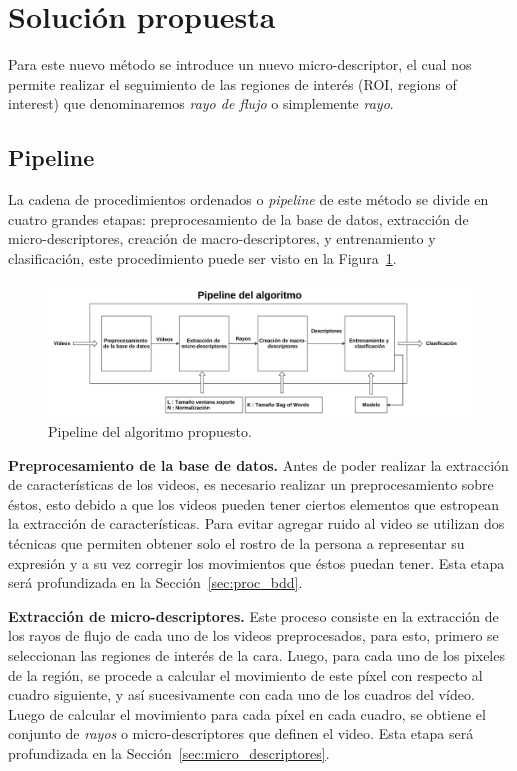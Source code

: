 \section{Solución propuesta}
\label{sec:solucion}

Para este nuevo método se introduce un nuevo micro-descriptor, el cual nos permite realizar el seguimiento de las regiones de interés (ROI, regions of interest) que denominaremos \textit{rayo de flujo} o simplemente \textit{rayo}.


\subsection{Pipeline}

La cadena de procedimientos ordenados o \textit{pipeline} de este método se divide en cuatro grandes etapas: preprocesamiento de la base de datos, extracción de micro-descriptores, creación de macro-descriptores, y entrenamiento y clasificación, este procedimiento puede ser visto en la Figura~\ref{intro:fig:pipeline}.
	\begin{figure}[b]
		\centering
		\includegraphics[width=1\textwidth]{Figuras/Diagramas/pipeline.png}
		\caption{Pipeline del algoritmo propuesto.}
		\label{intro:fig:pipeline}
	\end{figure}		
	
\textbf{Preprocesamiento de la base de datos.}
Antes de poder realizar la extracción de características de los videos, es necesario realizar un preprocesamiento sobre éstos, esto debido a que los videos pueden tener ciertos elementos que estropean la extracción de características. Para evitar agregar ruido al video se utilizan dos técnicas que permiten obtener solo el rostro de la persona a representar su expresión y a su vez corregir los movimientos que éstos puedan tener. Esta etapa será profundizada en la Sección~\ref{sec:proc_bdd}.


\textbf{Extracción de micro-descriptores.}
Este proceso consiste en la extracción de los rayos de flujo de cada uno de los videos preprocesados, para esto, primero se seleccionan las regiones de interés de la cara. Luego, para cada uno de los pixeles de la región, se procede a calcular el movimiento de este píxel con respecto al cuadro siguiente, y así sucesivamente con cada uno de los cuadros del vídeo. Luego de calcular el movimiento para cada píxel en cada cuadro, se obtiene el conjunto de \textit{rayos} o micro-descriptores que definen el video. Esta etapa será profundizada en la Sección~\ref{sec:micro_descriptores}.


